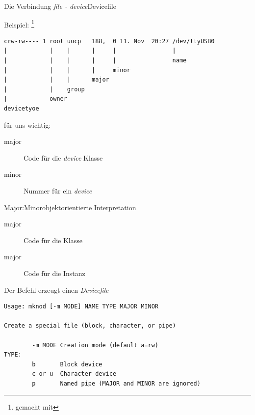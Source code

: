 \begin{frame}[fragile]{Die Verbindung {\em file - device}}{Devicefile}
\begin{block}{Beispiel: \footnote{gemacht mit }}
\vspace{-5mm}
{\footnotesize
\begin{verbatim}
crw-rw---- 1 root uucp   188,  0 11. Nov  20:27 /dev/ttyUSB0
|            |    |      |     |                |
|            |    |      |     |                name
|            |    |      |     minor                
|            |    |      major 
|            |    group 
|            owner
devicetyoe
\end{verbatim}
}
\end{block}
\vspace{-6mm}
\begin{block}{für uns wichtig:}
 \vspace{-3mm}
 \begin{description}
  \item[major] Code für die {\em device} Klasse
  \item[minor] Nummer für ein {\em device} 
 \end{description}
\end{block}
\end{frame}

\begin{frame}{Major:Minor}{objektorientierte Interpretation}
 \begin{description}
  \item[major] Code für die {\Large Klasse}
  \item[major] Code für die {\Large Instanz}
 \end{description}
\end{frame}

\begin{frame}[fragile]{Der Befehl }{erzeugt einen {\em Devicefile}}
\begin{verbatim}
Usage: mknod [-m MODE] NAME TYPE MAJOR MINOR                                    
                                                                                
Create a special file (block, character, or pipe)                               
                                                                                
        -m MODE Creation mode (default a=rw)                                    
TYPE:                                                                           
        b       Block device                                                    
        c or u  Character device                                                
        p       Named pipe (MAJOR and MINOR are ignored)                        
\end{verbatim} 
\end{frame}

